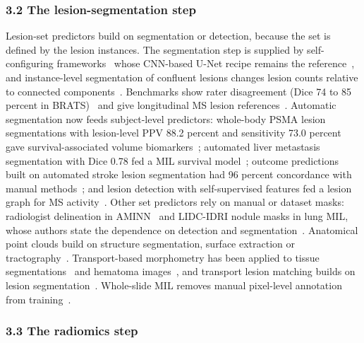 \documentclass[journal,onecolumn]{IEEEtran}
\begin{document}
\subsubsection{3.2 The lesion-segmentation step}

Lesion-set predictors build on segmentation or detection, because the set is defined by the lesion instances. The segmentation step is supplied by self-configuring frameworks~\cite{Isensee2021nnUNet,Baumgartner2021nnDetection} whose CNN-based U-Net recipe remains the reference~\cite{Isensee2024Revisited}, and instance-level segmentation of confluent lesions changes lesion counts relative to connected components~\cite{Wynen2025ConfLUNet}. Benchmarks show rater disagreement (Dice 74 to 85 percent in BRATS)~\cite{Menze2015Multimodal} and give longitudinal MS lesion references~\cite{Carass2017Longitudinal}. Automatic segmentation now feeds subject-level predictors: whole-body PSMA lesion segmentations with lesion-level PPV 88.2 percent and sensitivity 73.0 percent gave survival-associated volume biomarkers~\cite{Kendrick2022Fully}; automated liver metastasis segmentation with Dice 0.78 fed a MIL survival model~\cite{Alberb2026Automated}; outcome predictions built on automated stroke lesion segmentation had 96 percent concordance with manual methods~\cite{Brzus2026Clinical}; and lesion detection with self-supervised features fed a lesion graph for MS activity~\cite{Prabhakar2023Selfpruning}. Other set predictors rely on manual or dataset masks: radiologist delineation in AMINN~\cite{Chen2021AMINN} and LIDC-IDRI nodule masks in lung MIL, whose authors state the dependence on detection and segmentation~\cite{Chen2022LungMIL}. Anatomical point clouds build on structure segmentation, surface extraction or tractography~\cite{GutierrezBecker2018MSPNet,Vosylius2020NeonatalSurface,Sarasua2022Hippocampal,Chen2024TractGeoNet,Beetz2025PointVAE,Jia2024PFT}. Transport-based morphometry has been applied to tissue segmentations~\cite{Gerber2018Exploratory} and hematoma images~\cite{Ironside2025Predictive}, and transport lesion matching builds on lesion segmentation~\cite{Qahqaie2026Unbalanced}. Whole-slide MIL removes manual pixel-level annotation from training~\cite{Campanella2019Clinical,Lu2021CLAM,Shao2021TransMIL}.

\subsubsection{3.3 The radiomics step}
\end{document}
